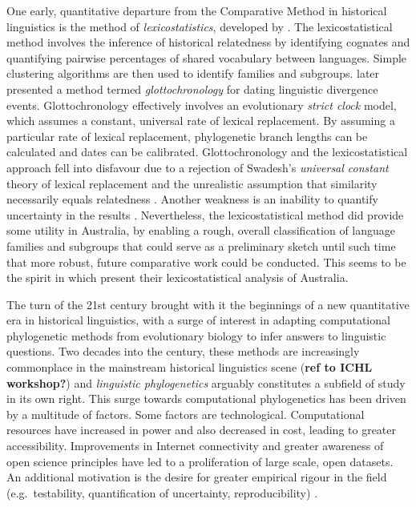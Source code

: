 One early, quantitative departure from the Comparative Method in historical linguistics is the method of \emph{lexicostatistics}, developed by \textcite{swadesh_lexico-statistic_1952}. The lexicostatistical method involves the inference of historical relatedness by identifying cognates and quantifying pairwise percentages of shared vocabulary between languages. Simple clustering algorithms are then used to identify families and subgroups. \textcite{swadesh_towards_1955} later presented a method termed \emph{glottochronology} for dating linguistic divergence events. Glottochronology effectively involves an evolutionary \emph{strict clock} model, which assumes a constant, universal rate of lexical replacement. By assuming a particular rate of lexical replacement, phylogenetic branch lengths can be calculated and dates can be calibrated. Glottochronology and the lexicostatistical approach fell into disfavour due to a rejection of Swadesh's \emph{universal constant} theory of lexical replacement \autocite{blust_why_2000} and the unrealistic assumption that similarity necessarily equals relatedness \autocite{bowern_computational_2018}. Another weakness is an inability to quantify uncertainty in the results \autocite{atkinson_curious_2005}. Nevertheless, the lexicostatistical method did provide some utility in Australia, by enabling a rough, overall classification of language families and subgroups that could serve as a preliminary sketch until such time that more robust, future comparative work could be conducted. This seems to be the spirit in which \textcite{ogrady_languages_1966} present their lexicostatistical analysis of Australia.

The turn of the 21st century brought with it the beginnings of a new quantitative era in historical linguistics, with a surge of interest in adapting computational phylogenetic methods from evolutionary biology to infer answers to linguistic questions. Two decades into the century, these methods are increasingly commonplace in the mainstream historical linguistics scene (\textbf{ref to ICHL workshop?}) and \emph{linguistic phylogenetics} arguably constitutes a subfield of study in its own right. This surge towards computational phylogenetics has been driven by a multitude of factors. Some factors are technological. Computational resources have increased in power and also decreased in cost, leading to greater accessibility. Improvements in Internet connectivity and greater awareness of open science principles have led to a proliferation of large scale, open datasets. An additional motivation is the desire for greater empirical rigour in the field (e.g.~testability, quantification of uncertainty, reproducibility) \autocites{atkinson_curious_2005}{mcmahon_finding_2003}{nunn_comparative_2011}.

